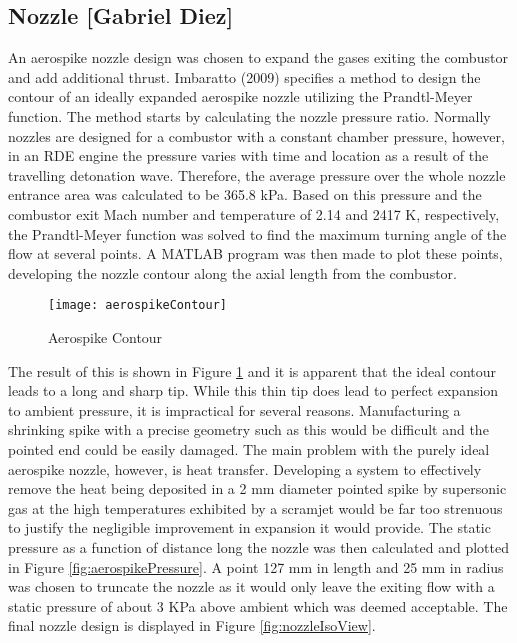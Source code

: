 \subsection{Nozzle [Gabriel Diez]}

An aerospike nozzle design was chosen to expand the gases exiting the combustor and add additional thrust. Imbaratto (2009) specifies a method to design the contour of an ideally expanded aerospike nozzle utilizing the Prandtl-Meyer function. The method starts by calculating the nozzle pressure ratio. Normally nozzles are designed for a combustor with a constant chamber pressure, however, in an RDE engine the pressure varies with time and location as a result of the travelling detonation wave. Therefore, the average pressure over the whole nozzle entrance area was calculated to be 365.8 kPa. Based on this pressure and the combustor exit Mach number and temperature of 2.14 and 2417 K, respectively, the Prandtl-Meyer function was solved to find the maximum turning angle of the flow at several points.   A MATLAB program was then made to plot these points, developing the nozzle contour along the axial length from the combustor.

\begin{figure}[H]
\begin{center}
\texttt{[image: aerospikeContour]}
\caption{Aerospike Contour}
\label{fig:aerospikeContour}
\end{center}
\end{figure}
 
The result of this is shown in Figure \ref{fig:aerospikeContour} and it is apparent that the ideal contour leads to a long and sharp tip. While this thin tip does lead to perfect expansion to ambient pressure, it is impractical for several reasons. Manufacturing a shrinking spike with a precise geometry such as this would be difficult and the pointed end could be easily damaged. The main problem with the purely ideal aerospike nozzle, however, is heat transfer. Developing a system to effectively remove the heat being deposited in a 2 mm diameter pointed spike by supersonic gas at the high temperatures exhibited by a scramjet would be far too strenuous to justify the negligible improvement in expansion it would provide. The static pressure as a function of distance long the nozzle was then calculated and plotted in Figure \ref{fig:aerospikePressure}. A point 127 mm in length and 25 mm in radius was chosen to truncate the nozzle as it would only leave the exiting flow with a static pressure of about 3 KPa above ambient which was deemed acceptable. The final nozzle design is displayed in Figure \ref{fig:nozzleIsoView}.

